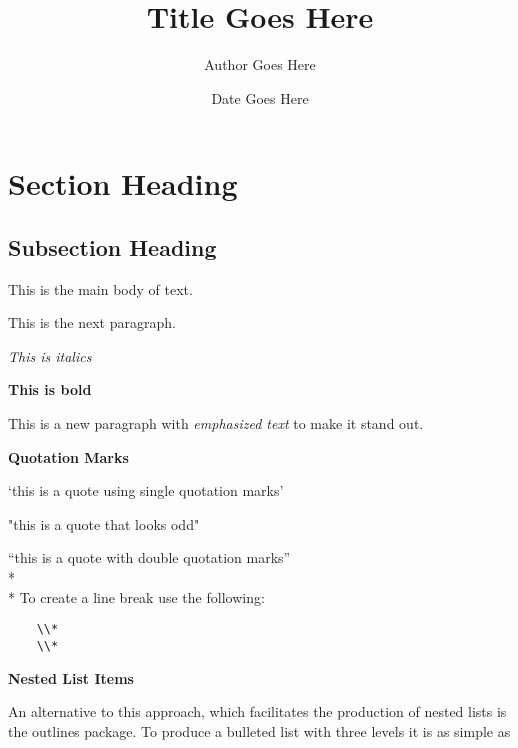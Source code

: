\documentclass{article}
\title{Title Goes Here}
\author{Author Goes Here}
\date{Date Goes Here}
\begin{document}
\maketitle

\tableofcontents

\pagebreak

\section{Section Heading}
\subsection{Subsection Heading}

This is the main body of text. 

This is the next paragraph. 

\textit{This is italics}

\textbf{This is bold}

This is a new paragraph with \emph{emphasized text} to make it stand out. 

\textbf{Quotation Marks}

`this is a quote using single quotation marks'

"this is a quote that looks odd"

``this is a quote with double quotation marks''
\\*
\\*
To create a line break use the following:
\begin{verbatim}
    \\*
    \\*
\end{verbatim}


\textbf{Nested List Items}

An alternative to this approach, which facilitates the production of nested lists is the outlines package. To produce a bulleted list with three levels it is as simple as
\end{document}
